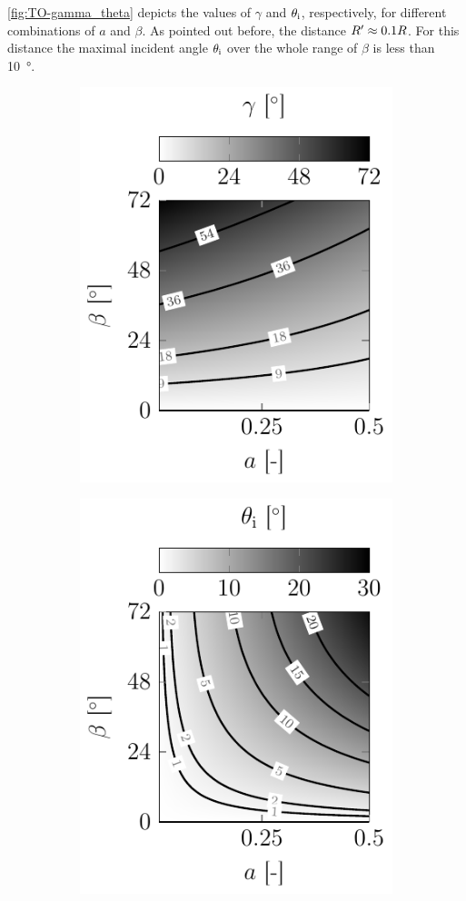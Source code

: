 \cref{fig:TO-gamma_theta} depicts the values of $\gamma$ and $\theta_{\mathrm{i}}$, 
respectively, for different combinations of $a$ and $\beta$. As pointed out 
before, the distance $R^{\prime} \approx 0.1R$. For this distance the maximal 
incident angle $\theta_{\mathrm{i}}$ over the whole range of $\beta$ is less than 
\SI{10}{\degree}.

\begin{figure}
  \centering
  \begin{subfigure}[b]{0.45\textwidth}
    \centering
    \includegraphics[]{External/gamma.pdf}
    \caption{}
    \label{fig:TO-gamma}
  \end{subfigure}
  \hfill
  \begin{subfigure}[b]{0.45\textwidth}
    \centering
    \includegraphics[]{External/theta_i.pdf}

\end{subfigure}
\end{figure}
